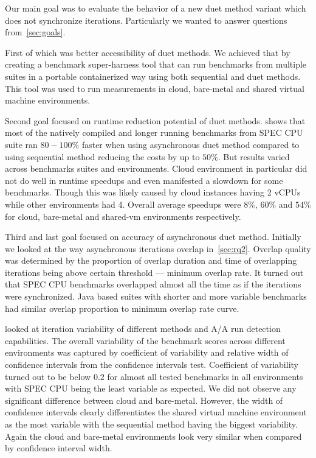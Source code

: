 

Our main goal was to evaluate the behavior of a new duet method variant which does not synchronize iterations.
Particularly we wanted to answer questions from~\cref{sec:goals}.

First of which was better accessibility of duet methods.
We achieved that by creating a benchmark super-harness tool that can run benchmarks from multiple suites in a portable containerized way using both sequential and duet methods.
This tool was used to run measurements in cloud, bare-metal and shared virtual machine environments.

Second goal focused on runtime reduction potential of duet methods.
 shows that most of the natively compiled and longer running benchmarks from SPEC CPU suite ran $80 - 100\%$ faster when using asynchronous duet method compared to using sequential method reducing the costs by up to $50\%$.
But results varied across benchmarks suites and environments.
Cloud environment in particular did not do well in runtime speedups and even manifested a slowdown for some benchmarks.
Though this was likely caused by cloud instances having 2 vCPUs while other environments had 4.
Overall average speedups were $8\%$, $60\%$ and $54\%$ for cloud, \mbox{bare-metal} and \mbox{shared-vm} environments respectively.

Third and last goal focused on accuracy of asynchronous duet method.
Initially we looked at the way asynchronous iterations overlap in~\cref{sec:rq2}.
Overlap quality was determined by the proportion of overlap duration and time of overlapping iterations being above certain threshold --- minimum overlap rate.
It turned out that SPEC CPU benchmarks overlapped almost all the time as if the iterations were synchronized.
Java based suites with shorter and more variable benchmarks had similar overlap proportion to minimum overlap rate curve.

 looked at iteration variability of different methods and A/A run detection capabilities.
The overall variability of the benchmark scores across different environments was captured by coefficient of variability and relative width of confidence intervals from the confidence intervals test.
Coefficient of variability turned out to be below $0.2$ for almost all tested benchmarks in all environments with SPEC CPU being the least variable as expected.
We did not observe any significant difference between cloud and bare-metal.
However, the width of confidence intervals clearly differentiates the shared virtual machine environment as the most variable with the sequential method having the biggest variability.
Again the cloud and \mbox{bare-metal} environments look very similar when compared by confidence interval width.

